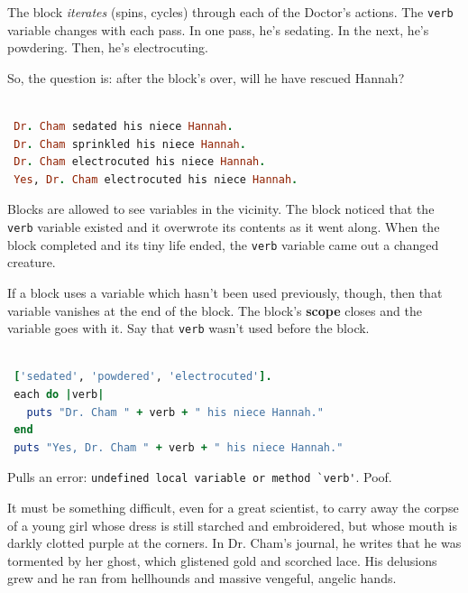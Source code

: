 \documentclass[10pt,twoside]{report}
\begin{document}
The block {\em iterates} (spins, cycles) through each of the Doctor's
actions.  The \lstinline[breaklines=true]|verb| variable changes with
each pass.  In one pass, he's sedating.  In the next, he's powdering.
Then, he's electrocuting.

So, the question is: after the block's over, will he have rescued
Hannah?


\begin{lstlisting}[basicstyle=\ttfamily\color{basiccolor},
    commentstyle = \ttfamily\color{commentcolor},
    keywordstyle=\ttfamily\color{keywordscolor},
    stringstyle=\color{stringcolor},
    language=Ruby,
    basicstyle=\small\ttfamily,
    showstringspaces=false,
  ]

 Dr. Cham sedated his niece Hannah.
 Dr. Cham sprinkled his niece Hannah.
 Dr. Cham electrocuted his niece Hannah.
 Yes, Dr. Cham electrocuted his niece Hannah.

\end{lstlisting}


Blocks are allowed to see variables in the vicinity.  The block
noticed that the \lstinline[breaklines=true]|verb| variable existed
and it overwrote its contents as it went along.  When the block
completed and its tiny life ended, the
\lstinline[breaklines=true]|verb| variable came out a changed
creature.

If a block uses a variable which hasn't been used previously, though,
then that variable vanishes at the end of the block.  The block's {\bf
  scope} closes and the variable goes with it.  Say that
\lstinline[breaklines=true]|verb| wasn't used before the block.


\begin{lstlisting}[basicstyle=\ttfamily\color{basiccolor},
    commentstyle = \ttfamily\color{commentcolor},
    keywordstyle=\ttfamily\color{keywordscolor},
    stringstyle=\color{stringcolor},
    language=Ruby,
    basicstyle=\small\ttfamily,
    showstringspaces=false,
  ]

 ['sedated', 'powdered', 'electrocuted'].
 each do |verb|
   puts "Dr. Cham " + verb + " his niece Hannah."
 end
 puts "Yes, Dr. Cham " + verb + " his niece Hannah."

\end{lstlisting}


Pulls an error: 
\lstinline[breaklines=true]|undefined local variable or method `verb'|.  
Poof.

It must be something difficult, even for a great scientist, to carry
away the corpse of a young girl whose dress is still starched and
embroidered, but whose mouth is darkly clotted purple at the corners.
In Dr. Cham's journal, he writes that he was tormented by her ghost,
which glistened gold and scorched lace.  His delusions grew and he ran
from hellhounds and massive vengeful, angelic hands.
\end{document}
